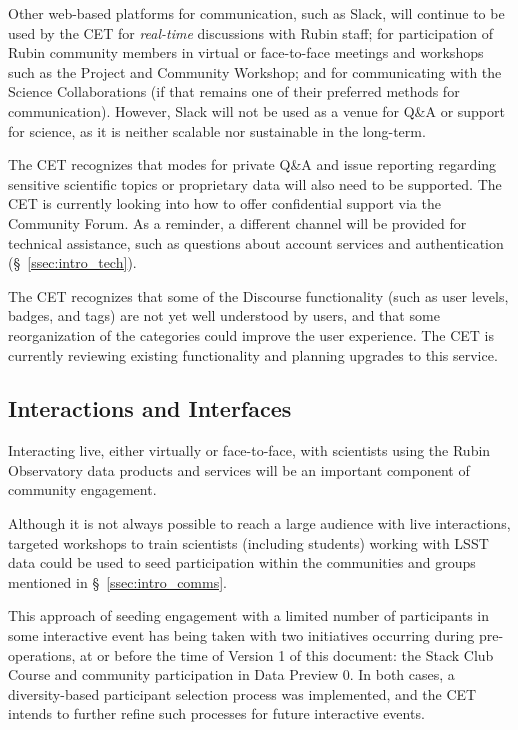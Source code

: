 \documentclass[DM,lsstdraft,toc]{lsstdoc}
\begin{document}
Other web-based platforms for communication, such as Slack, will continue to be used by the CET for \textit{real-time} discussions with Rubin staff; for participation of Rubin community members in virtual or face-to-face meetings and workshops such as the Project and Community Workshop; and for communicating with the Science Collaborations (if that remains one of their preferred methods for communication).
However, Slack will not be used as a venue for Q\&A or support for science, as it is neither scalable nor sustainable in the long-term.

The CET recognizes that modes for private Q\&A and issue reporting regarding sensitive scientific topics or proprietary data will also need to be supported.
The CET is currently looking into how to offer confidential support via the Community Forum.
As a reminder, a different channel will be provided for technical assistance, such as questions about account services and authentication (\S~\ref{ssec:intro_tech}).

The CET recognizes that some of the Discourse functionality (such as user levels, badges, and tags) are not yet well understood by users, and that some reorganization of the categories could improve the user experience.
The CET is currently reviewing existing functionality and planning upgrades to this service.


\subsection{Interactions and Interfaces}\label{ssec:mod_interface}

Interacting live, either virtually or face-to-face, with scientists using the Rubin Observatory data products and services will be an important component of community engagement.

Although it is not always possible to reach a large audience with live interactions, targeted workshops to train scientists (including students) working with LSST data could be used to seed participation within the communities and groups mentioned in \S~\ref{ssec:intro_comms}.

This approach of seeding engagement with a limited number of participants in some interactive event has being taken with two initiatives occurring during pre-operations, at or before the time of Version 1 of this document: the Stack Club Course and community participation in Data Preview 0.
In both cases, a diversity-based participant selection process was implemented, and the CET intends to further refine such processes for future interactive events. 
\end{document}
